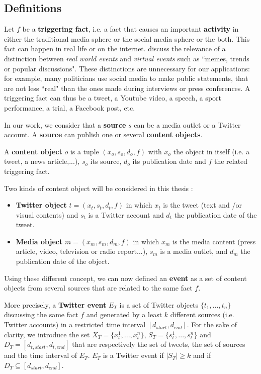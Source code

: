\subsection{Definitions \label{Subsec: Definitions}}
Let $f$ be a \textbf{triggering fact}, i.e. a fact that causes an
important \textbf{activity} in either the traditional media sphere or the social media sphere or the both. This fact can happen in real life or on the internet. \citet{panagiotou_detecting_2016} discuss the relevance of a distinction between \textit{real world events} and \textit{virtual events} such as ``memes, trends or popular discussions". These distinctions are unnecessary for our applications: for example, many politicians use social media to make public statements, that are not less ``real" than the ones made during interviews or press conferences. A triggering fact can thus be a tweet, a Youtube video, a speech, a sport performance, a trial, a Facebook post, etc.


In our work, we consider that a \textbf{source} $s$ can be a media outlet or a Twitter account. A \textbf{source} can publish one or several \textbf{content objects}.


A \textbf{content object} $o$ is a tuple $(x_o, s_o, d_o, f)$ with $x_o$ the object in itself (i.e. a  tweet, a news article,...), $s_o$ its source,
$d_o$ its publication date and $f$ the related triggering fact.

Two kinds of content object will be considered in this thesis :
\begin{itemize}
\item \textbf{Twitter object} $t =(x_t, s_t,d_t, f ) $ in which $x_t$ is the tweet
(text and /or visual contents) and $s_t$ is a Twitter account and $d_t$
the publication date of the tweet.
\item \textbf{Media object}  $m=(x_m,s_m,d_m,f)$ in which $x_m$ is the media content (press article, video, television or radio report...), $s_m$ is a media outlet, and $d_m$ the publication date of the object.
\end{itemize}
  
Using these different concept, we can now defined an \textbf{event} as a set of content objects from several sources that are related to the same fact $f$. 


More precisely, a \textbf{Twitter event} $E_T$ is a set of Twitter objects
$\{t_1,...,t_n\}$  discussing the same fact $f$ and generated by a least $k$ different sources (i.e. Twitter accounts) in a restricted time interval $[d_{start},d_{end}]$. For the sake of clarity, we introduce the set 
$X_T = \{x_t^1, ..., x_t^n\}$, 
$S_T = \{s_t^1, ... ,s_t^n\}$ and 
$D_T = [d_{t,start},d_{t,end}]$ that are respectively the
set of tweets, the set of sources and the time interval of $E_T$. $E_T$ is a Twitter event if $|S_T|  \geq k$ and if  $D_T 
\subseteq [d_{start},d_{end}]$.


